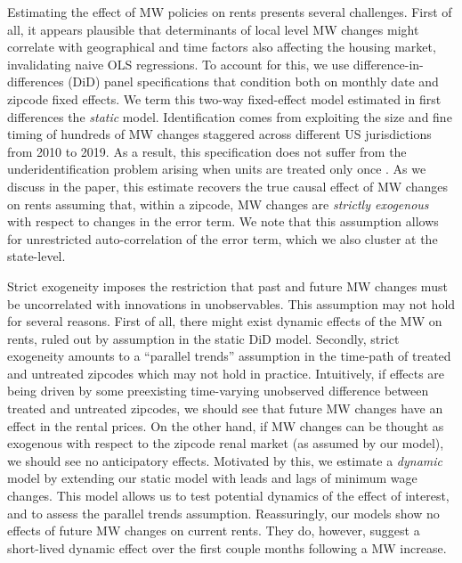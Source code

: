 Estimating the effect of MW policies on rents presents several challenges. First of all, it 
appears plausible that determinants of local level MW changes might correlate with 
geographical and time factors also affecting the housing market, invalidating naive OLS 
regressions. To account for this, we use difference-in-differences (DiD) panel specifications 
that condition both on monthly date and zipcode fixed effects. We term this two-way 
fixed-effect model estimated in first differences the \textit{static} model. Identification 
comes from exploiting the size and fine timing of hundreds of MW changes staggered across 
different US jurisdictions from 2010 to 2019. As a result, this specification does not 
suffer from the underidentification problem arising when units are treated only once 
\parencite{BorusyakJaravel2017}. As we discuss in the paper, this estimate recovers the true 
causal effect of MW changes on rents assuming that, within a zipcode, MW changes are 
\textit{strictly exogenous} with respect to changes in the error term. We note that 
this assumption allows for unrestricted auto-correlation of the error term, which we also 
cluster at the state-level.

Strict exogeneity imposes the restriction that past and future MW changes must be uncorrelated 
with innovations in unobservables. This assumption may not hold for several reasons. First of 
all, there might exist dynamic effects of the MW on rents, ruled out by assumption in the static DiD 
model. Secondly, strict exogeneity amounts to a ``parallel trends'' assumption in the time-path of 
treated and untreated zipcodes which may not hold in practice. Intuitively, if effects are 
being driven by some preexisting time-varying unobserved difference between treated and untreated 
zipcodes, we should see that future MW changes have an effect in the rental prices. On the other 
hand, if MW changes can be thought as exogenous with respect to the zipcode renal market (as 
assumed by our model), we should see no anticipatory effects. Motivated by this, we estimate a 
\textit{dynamic} model by extending our static model with leads and lags of minimum wage 
changes. This model allows us to test potential dynamics of the effect of interest, and to 
assess the parallel trends assumption. Reassuringly, our models show no effects of future MW 
changes on current rents. They do, however, suggest a short-lived dynamic effect over the first 
couple months following a MW increase.

